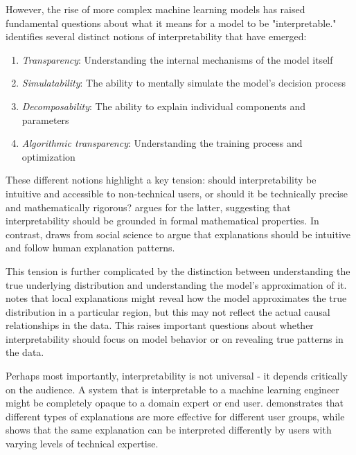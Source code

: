 However, the rise of more complex machine learning models has raised fundamental questions about what it means for a model to be "interpretable." \textcite{lipton_mythos_2018} identifies several distinct notions of interpretability that have emerged:

\begin{enumerate}
    \item \emph{Transparency}: Understanding the internal mechanisms of the model itself
    \item \emph{Simulatability}: The ability to mentally simulate the model's decision process
    \item \emph{Decomposability}: The ability to explain individual components and parameters
    \item \emph{Algorithmic transparency}: Understanding the training process and optimization
\end{enumerate}

These different notions highlight a key tension: should interpretability be intuitive and accessible to non-technical users, or should it be technically precise and mathematically rigorous? \textcite{rudin_stop_2019} argues for the latter, suggesting that interpretability should be grounded in formal mathematical properties. In contrast, \textcite{miller_explanation_2017} draws from social science to argue that explanations should be intuitive and follow human explanation patterns.

This tension is further complicated by the distinction between understanding the true underlying distribution and understanding the model's approximation of it. \textcite{ribeiro_why_2016} notes that local explanations might reveal how the model approximates the true distribution in a particular region, but this may not reflect the actual causal relationships in the data. This raises important questions about whether interpretability should focus on model behavior or on revealing true patterns in the data.

Perhaps most importantly, interpretability is not universal - it depends critically on the audience. A system that is interpretable to a machine learning engineer might be completely opaque to a domain expert or end user. \textcite{wang_effects_2016} demonstrates that different types of explanations are more effective for different user groups, while \textcite{zhang_effect_2020} shows that the same explanation can be interpreted differently by users with varying levels of technical expertise.

